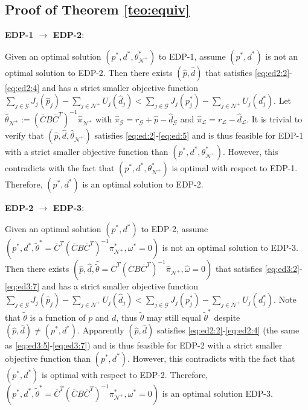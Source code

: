 \documentclass[journal,12pt,onecolumn,draftclsnofoot]{IEEEtran}
\begin{document}
\subsection{Proof of Theorem \ref{teo:equiv}}

\noindent
\textbf{EDP-1 $\rightarrow$ EDP-2}:

Given an optimal solution $(p^*,d^*,\theta^*_{\mathcal{N}^+})$ to EDP-1, assume $(p^*,d^*)$ is not an optimal solution to EDP-2. Then there exists $(\hat{p},\hat{d})$ that satisfies \eqref{eq:ed2:2}-\eqref{eq:ed2:4} and has a strict smaller objective function $\sum_{j\in\mathcal{G}}J_j(\hat p_j)-\sum_{j\in\mathcal{N}^+}U_j(\hat d_j) < \sum_{j\in\mathcal{G}}J_j( p^*_j)-\sum_{j\in\mathcal{N}^+}U_j( d^*_j) $. Let $\hat \theta_{\mathcal{N}^+} := (\bar{C}B\bar{C}^T)^{-1}\hat \pi_{\mathcal{N}^+}$ with $\hat \pi_{\mathcal{G}} =r_\mathcal{G}+\hat{p}-\hat d_\mathcal{G}$ and $\hat \pi_{\mathcal{L}}=r_\mathcal{L}-\hat d_\mathcal{L}$. It is trivial to verify that $(\hat{p},\hat{d},\hat \theta_{\mathcal{N}^+})$ satisfies \eqref{eq:ed:2}-\eqref{eq:ed:5} and is thus feasible for EDP-1 with a strict smaller objective function than $(p^*,d^*,\theta^*_{\mathcal{N}^+})$. However, this contradicts with the fact that $(p^*,d^*,\theta^*_{\mathcal{N}^+})$ is optimal with respect to EDP-1. Therefore, $(p^*,d^*)$ is an optimal solution to EDP-2. 

\noindent
\textbf{EDP-2 $\rightarrow$ EDP-3}:

Given an optimal solution $(p^*,d^*)$ to EDP-2, assume $(p^*,d^*, \tilde \theta^*=\bar{C}^T(\bar{C}B\bar{C}^T)^{-1}\pi_{\mathcal{N}^+}^*,\omega^*=0)$ is not an optimal solution to EDP-3. Then there exists $(\hat p,\hat d, \hat{\tilde \theta}=\bar{C}^T(\bar{C}B\bar{C}^T)^{-1}\hat \pi_{\mathcal{N}^+},\hat \omega=0)$ that satisfies \eqref{eq:ed3:2}-\eqref{eq:ed3:7} and has a strict smaller objective function $\sum_{j\in\mathcal{G}}J_j(\hat p_j)-\sum_{j\in\mathcal{N}^+}U_j(\hat d_j) < \sum_{j\in\mathcal{G}}J_j( p^*_j)-\sum_{j\in\mathcal{N}^+}U_j( d^*_j) $. Note that ${\tilde{\theta}}$ is a function of $p$ and $d$, thus $\hat{\tilde \theta}$ may still equal $\tilde\theta^*$ despite $(\hat{p},\hat{d}) \neq (p^*,d^*)$. Apparently $(\hat{p},\hat{d})$ satisfies \eqref{eq:ed2:2}-\eqref{eq:ed2:4} (the same as \eqref{eq:ed3:5}-\eqref{eq:ed3:7}) and is thus feasible for EDP-2 with a strict smaller objective function than $(p^*,d^*)$. However, this contradicts with the fact that $(p^*,d^*)$ is optimal with respect to EDP-2. Therefore, $(p^*,d^*, \tilde \theta^*=\bar{C}^T(\bar{C}B\bar{C}^T)^{-1}\pi_{\mathcal{N}^+}^*,\omega^*=0)$ is an optimal solution EDP-3.
\end{document}
